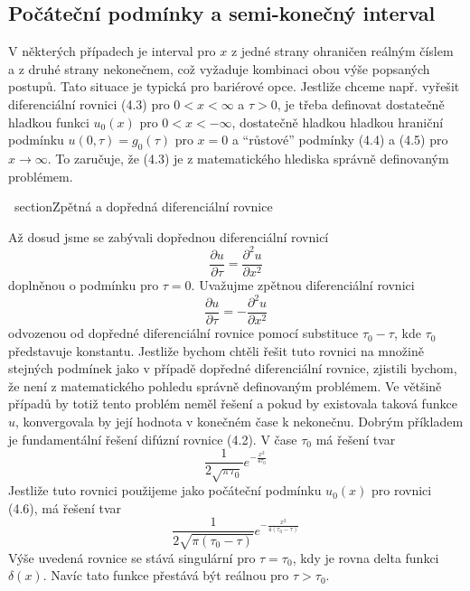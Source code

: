 \documentclass[a4paper]{book}
\begin{document}
\subsection{Počáteční podmínky a semi-konečný interval}

V některých případech je interval pro $x$ z jedné strany ohraničen reálným číslem a z druhé strany nekonečnem, což vyžaduje kombinaci obou výše popsaných postupů. Tato situace je typická pro bariérové opce. Jestliže chceme např. vyřešit diferenciální rovnici (4.3) pro $0 < x < \infty$ a $\tau > 0$, je třeba definovat dostatečně hladkou funkci $u_0(x)$ pro $0 < x < -\infty$, dostatečně hladkou hladkou hraniční podmínku $u(0, \tau) = g_0(\tau)$ pro $x = 0$ a ``růstové'' podmínky (4.4) a (4.5) pro $x \rightarrow \infty$. To zaručuje, že (4.3) je z matematického hlediska správně definovaným problémem.

\ section{Zpětná a dopředná diferenciální rovnice}

Až dosud jsme se zabývali dopřednou diferenciální rovnicí
\begin{equation*}
\frac{\partial u}{\partial \tau} = \frac{\partial^2 u}{\partial x^2}
\end{equation*}
doplněnou o podmínku pro $\tau = 0$. Uvažujme zpětnou diferenciální rovnici
\begin{equation}
\frac{\partial u}{\partial \tau} = -\frac{\partial^2 u}{\partial x^2}
\end{equation}
odvozenou od dopředné diferenciální rovnice pomocí substituce $\tau_0 - \tau$, kde $\tau_0$ představuje konstantu. Jestliže bychom chtěli řešit tuto rovnici na množině stejných podmínek jako v případě dopředné diferenciální rovnice, zjistili bychom, že není z matematického pohledu správně definovaným problémem. Ve většině případů by totiž tento problém neměl řešení a pokud by existovala taková funkce $u$, konvergovala by její hodnota v konečném čase k nekonečnu. Dobrým příkladem je fundamentální řešení difúzní rovnice (4.2). V čase $\tau_0$ má řešení tvar
\begin{equation*}
\frac{1}{2\sqrt{\pi \tau_0}}e^{-\frac{x^2}{4 \tau_0}}
\end{equation*}
Jestliže tuto rovnici použijeme jako počáteční podmínku $u_0(x)$ pro rovnici (4.6), má řešení tvar
\begin{equation*}
\frac{1}{2\sqrt{\pi (\tau_0 - \tau)}}e^{-\frac{x^2}{4 (\tau_0 - \tau)}}
\end{equation*}
Výše uvedená rovnice se stává singulární pro $\tau = \tau_0$, kdy je rovna delta funkci $\delta(x)$. Navíc tato funkce přestává být reálnou pro $\tau > \tau_0$.
\end{document}
